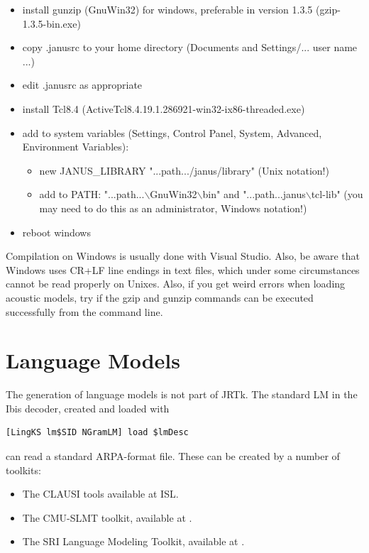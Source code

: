 \documentclass[a4paper,twoside]{book}
\begin{document}
\begin{itemize}
\item install gunzip (GnuWin32) for windows, preferable in version 1.3.5 (gzip-1.3.5-bin.exe)
\item copy .janusrc to your home directory (Documents and Settings/... user name ...)
\item edit .janusrc as appropriate
\item install Tcl8.4 (ActiveTcl8.4.19.1.286921-win32-ix86-threaded.exe)
\item add to system variables (Settings, Control Panel, System, Advanced, Environment Variables):
  \begin{itemize}
  \item new JANUS\_LIBRARY "...path.../janus/library" (Unix notation!)
  \item add to PATH: "...path...$\backslash$GnuWin32$\backslash$bin" and "...path...janus$\backslash$tcl-lib" (you may need to do this as an administrator, Windows notation!)
  \end{itemize}
\item reboot windows
\end{itemize}

Compilation on Windows is usually done with Visual Studio. Also, be aware that
Windows uses CR+LF line endings in text files, which under some circumstances
cannot be read properly on Unixes. Also, if you get weird errors when loading acoustic
models, try if the gzip and gunzip commands can be executed successfully from the command
line.

\section{Language Models} \label{janus:lms}

The generation of language models is not part of JRTk. The standard LM
in the Ibis decoder, created and loaded with

\begin{verbatim}
[LingKS lm$SID NGramLM] load $lmDesc
\end{verbatim}

can read a standard ARPA-format file. These can be created by a number of
toolkits:

\begin{itemize}
\item The CLAUSI tools available at ISL.
\item The CMU-SLMT toolkit, available at 
.
\item The SRI Language Modeling Toolkit, available at 
.
\end{itemize}
\end{document}
